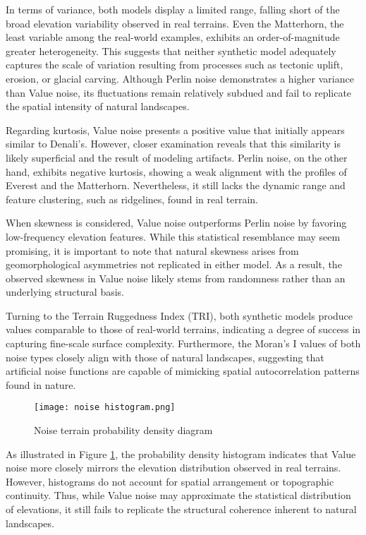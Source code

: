 In terms of variance, both models display a limited range, falling short of the broad elevation variability observed in real terrains. Even the Matterhorn, the least variable among the real-world 
examples, exhibits an order-of-magnitude greater heterogeneity. This suggests that neither synthetic model adequately captures the scale of variation resulting from processes such as tectonic 
uplift, erosion, or glacial carving. Although Perlin noise demonstrates a higher variance than Value noise, its fluctuations remain relatively subdued and fail to replicate the spatial intensity 
of natural landscapes.

Regarding kurtosis, Value noise presents a positive value that initially appears similar to Denali's. However, closer examination reveals that this similarity is likely superficial and the result 
of modeling artifacts. Perlin noise, on the other hand, exhibits negative kurtosis, showing a weak alignment with the profiles of Everest and the Matterhorn. Nevertheless, it still lacks the dynamic 
range and feature clustering, such as ridgelines, found in real terrain.

When skewness is considered, Value noise outperforms Perlin noise by favoring low-frequency elevation features. While this statistical resemblance may seem promising, it is important to note that 
natural skewness arises from geomorphological asymmetries not replicated in either model. As a result, the observed skewness in Value noise likely stems from randomness rather than an underlying 
structural basis.

Turning to the Terrain Ruggedness Index (TRI), both synthetic models produce values comparable to those of real-world terrains, indicating a degree of success in capturing fine-scale surface complexity. 
Furthermore, the Moran's I values of both noise types closely align with those of natural landscapes, suggesting that artificial noise functions are capable of mimicking spatial autocorrelation patterns 
found in nature.

\begin{figure}[H]
    \centering
    \texttt{[image: noise histogram.png]}
    \caption{Noise terrain probability density diagram}
    \label{fig:histogram_noise}
\end{figure}

As illustrated in Figure \ref{fig:histogram_noise}, the probability density histogram indicates that Value noise more closely mirrors the elevation distribution observed in real terrains. However, histograms do not account for 
spatial arrangement or topographic continuity. Thus, while Value noise may approximate the statistical distribution of elevations, it still fails to replicate the structural coherence inherent to natural 
landscapes.

